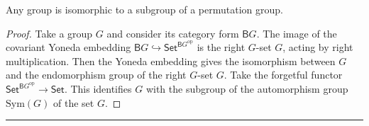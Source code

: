 \begin{cor} Any group is isomorphic to a subgroup of a permutation group.
\end{cor}
\begin{proof}
Take a group $G$ and consider its category form $\mathsf{B}G$. The image of the covariant Yoneda embedding $\mathsf{B}G\hookrightarrow \mathsf{Set}^{\mathsf{B}G^{\textrm{op}}}$ is the right $G$-set $G$, acting by right multiplication. Then the Yoneda embedding gives the isomorphism between $G$ and the endomorphism group of the right $G$-set $G$. Take the forgetful functor $\mathsf{Set}^{\mathsf{B}G^{\textrm{op}}}\rightarrow\mathsf{Set}$. This identifies $G$ with the subgroup of the automorphism group $\textrm{Sym}(G)$ of the set $G$.
\end{proof}
\noindent\rule{\textwidth}{1pt}
\newline
